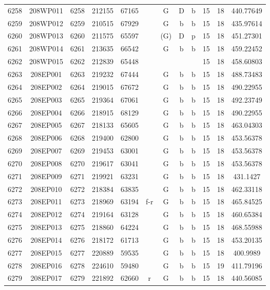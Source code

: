 \begin{tabular}{|*{12}{c|}}
6258 & 208WP011 & 6258 & 212155 & 67165 &  & G & D & b & 15 & 18 & 440.77649 \\ 
6259 & 208WP012 & 6259 & 210515 & 67929 &  & G & b & b & 15 & 18 & 435.97614 \\ 
6260 & 208WP013 & 6260 & 211575 & 65597 &  & (G) & D & p & 15 & 18 & 451.27301 \\ 
6261 & 208WP014 & 6261 & 213635 & 66542 &  & G & b & b & 15 & 18 & 459.22452 \\ 
6262 & 208WP015 & 6262 & 212839 & 65448 &  &  &  &  & 15 & 18 & 458.60803 \\ 
6263 & 208EP001 & 6263 & 219232 & 67444 &  & G & b & b & 15 & 18 & 488.73483 \\ 
6264 & 208EP002 & 6264 & 219015 & 67672 &  & G & b & b & 15 & 18 & 490.22955 \\ 
6265 & 208EP003 & 6265 & 219364 & 67061 &  & G & b & b & 15 & 18 & 492.23749 \\ 
6266 & 208EP004 & 6266 & 218915 & 68129 &  & G & b & b & 15 & 18 & 490.22955 \\ 
6267 & 208EP005 & 6267 & 218133 & 65605 &  & G & b & b & 15 & 18 & 463.04303 \\ 
6268 & 208EP006 & 6268 & 219400 & 62800 &  & G & b & b & 15 & 18 & 453.56378 \\ 
6269 & 208EP007 & 6269 & 219453 & 63001 &  & G & b & b & 15 & 18 & 453.56378 \\ 
6270 & 208EP008 & 6270 & 219617 & 63041 &  & G & b & b & 15 & 18 & 453.56378 \\ 
6271 & 208EP009 & 6271 & 219921 & 63231 &  & G & b & b & 15 & 18 & 431.1427 \\ 
6272 & 208EP010 & 6272 & 218384 & 63835 &  & G & b & b & 15 & 18 & 462.33118 \\ 
6273 & 208EP011 & 6273 & 218969 & 63194 & f-r & G & b & b & 15 & 18 & 465.84525 \\ 
6274 & 208EP012 & 6274 & 219164 & 63128 &  & G & b & b & 15 & 18 & 460.65384 \\ 
6275 & 208EP013 & 6275 & 218860 & 64224 &  & G & b & b & 15 & 18 & 468.55988 \\ 
6276 & 208EP014 & 6276 & 218172 & 61713 &  & G & b & b & 15 & 18 & 453.20135 \\ 
6277 & 208EP015 & 6277 & 220889 & 59535 &  & G & b & b & 15 & 18 & 400.9989 \\ 
6278 & 208EP016 & 6278 & 224610 & 59480 &  & G & b & b & 15 & 19 & 411.79196 \\ 
6279 & 208EP017 & 6279 & 221892 & 62660 & r & G & b & b & 15 & 18 & 440.56085 \\ 

\end{tabular}
